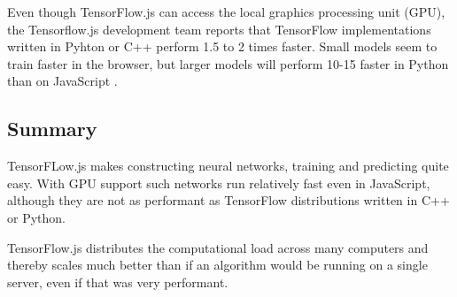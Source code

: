 Even though TensorFlow.js can access the local graphics processing unit (GPU), 
the Tensorflow.js development team reports that TensorFlow implementations 
written in Pyhton or C++ perform 1.5 to 2 times faster.
Small models seem to train faster in the browser, but larger models will 
perform 10-15 faster in Python than on JavaScript \cite{TenosrFLowJs}.

\subsection{Summary}
TensorFLow.js makes constructing neural networks, training and predicting quite easy.
With GPU support such networks run relatively fast even in JavaScript, although 
they are not as performant as TensorFlow distributions
written in C++ or Python. 

TensorFlow.js  distributes the computational load 
across many computers and thereby scales much better than if an algorithm would be running on a single
server, even if that was very performant.
